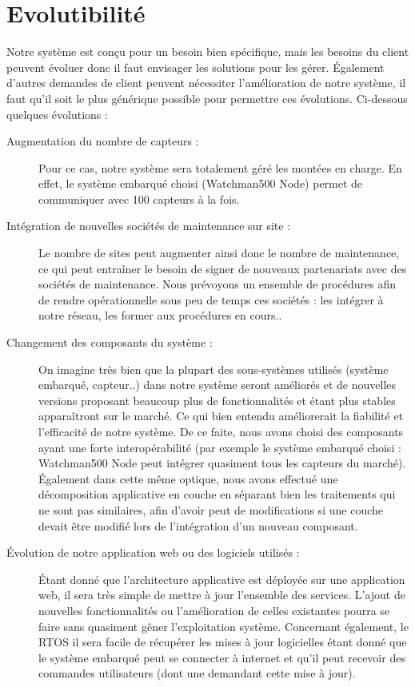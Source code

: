 \section{Evolutibilité}

Notre système est conçu pour un besoin bien spécifique, mais les besoins du client peuvent évoluer
donc il faut envisager les solutions pour les gérer.
Également d'autres demandes de client peuvent nécessiter l'amélioration de notre système, il faut qu'il soit
le plus générique possible pour permettre ces évolutions. Ci-dessous quelques évolutions :

\begin{description}
           \item[Augmentation du nombre de capteurs :] Pour ce cas, notre système sera totalement géré les montées en charge. En effet, le système embarqué choisi (Watchman500 Node) permet de communiquer avec 100 capteurs à la fois.
           \item[Intégration de nouvelles sociétés de maintenance sur site :] Le nombre de sites peut augmenter ainsi donc le nombre de maintenance, ce qui peut entraîner le besoin de signer de nouveaux partenariats avec des sociétés de maintenance. Nous prévoyons un ensemble de procédures afin de rendre opérationnelle sous peu de temps ces sociétés : les intégrer à notre réseau, les former aux procédures en cours..
           \item[Changement des composants du système :] On imagine très bien que la plupart des sous-systèmes utilisés (système embarqué, capteur..)
dans notre système seront améliorés et de nouvelles versions proposant beaucoup plus de fonctionnalités et étant plus stables apparaîtront sur le marché. Ce qui bien entendu améliorerait la fiabilité et l'efficacité de notre système. 
            De ce faite, nous avons choisi des composants ayant une forte interopérabilité (par exemple le système embarqué choisi : Watchman500 Node peut intégrer quasiment tous les capteurs du marché).
            Également dans cette même optique, nous avons effectué une décomposition applicative en couche en séparant bien les traitements qui ne sont pas similaires, afin d'avoir peut de modifications si une couche devait être modifié lors de l'intégration d'un nouveau composant.
           \item[Évolution de notre application web ou des logiciels utilisés :] Étant donné que l'architecture applicative est déployée sur une application web, il sera très simple de mettre à jour l'ensemble des services. L'ajout de nouvelles fonctionnalités ou l'amélioration de celles existantes pourra se faire sans quasiment gêner l'exploitation système. Concernant également, le RTOS il sera facile de récupérer les mises à jour logicielles étant donné que le système embarqué peut se connecter à internet et qu'il peut recevoir des commandes utilisateurs (dont une demandant cette mise à jour).
\end{description}